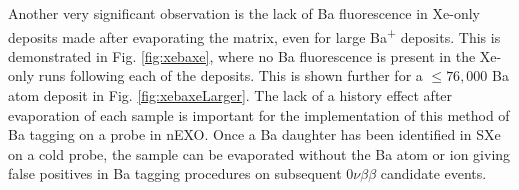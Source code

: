 Another very significant observation is the lack of Ba fluorescence in Xe-only deposits made after evaporating the matrix, even for large Ba\textsuperscript{+} deposits.  This is demonstrated in Fig. \ref{fig:xebaxe}, where no Ba fluorescence is present in the Xe-only runs following each of the deposits.  This is shown further for a $\leq 76,000$ Ba atom deposit in Fig. \ref{fig:xebaxeLarger}.  The lack of a history effect after evaporation of each sample is important for the implementation of this method of Ba tagging on a probe in nEXO.  Once a Ba daughter has been identified in SXe on a cold probe, the sample can be evaporated without the Ba atom or ion giving false positives in Ba tagging procedures on subsequent $0\nu\beta\beta$ candidate events.




